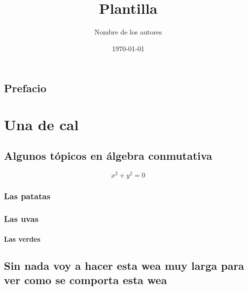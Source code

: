\documentclass[draft]{qx-files/qx-book}
\title{Plantilla}
\author{Nombre de los autores}
\date{\today}
\begin{document}
\frontmatter


\maketitle





\chapter{Prefacio}

\lipsum[1]




\tableofcontents

\mainmatter

\part{Una de cal}


\chapter[Álgebra conmutativa]{Algunos tópicos en álgebra conmutativa}
\lipsum[2]
\begin{equation}
  x^2 + y^2 = 0
\end{equation}

\lipsum[1]

\section{Las patatas}

\lipsum[1]



\lipsum[1]

\section{Las uvas}

\lipsum[1]

\subsection{Las verdes}

\lipsum[1]

\chapter*{Sin nada voy a hacer esta wea muy larga para ver como se comporta esta wea}
\end{document}
